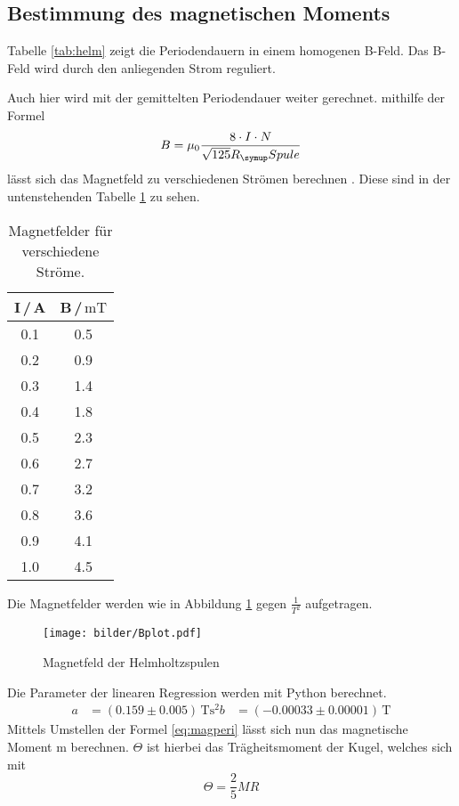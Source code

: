 \subsection{Bestimmung des magnetischen Moments}
Tabelle \ref{tab:helm} zeigt die Periodendauern in einem homogenen B-Feld. Das
B-Feld wird durch den anliegenden Strom reguliert.

Auch hier wird mit der gemittelten Periodendauer weiter gerechnet.
mithilfe der Formel
\begin{equation*}
  B=\mu_0\frac{8\cdot I\cdot N}{\sqrt{125}R_\su{Spule}}
\end{equation*}
lässt sich das Magnetfeld zu verschiedenen Strömen berechnen \cite{bfeld}.
Diese sind in der untenstehenden Tabelle \ref{tab:bfeld} zu sehen.
\begin{table}
  \centering
  \begin{tabular}{c c}
    \toprule
    I\,/\,A & B\,/\,$\si{\milli\tesla}$\\
    \midrule
    0.1 &  0.5 \\
    0.2 &  0.9 \\
    0.3 &  1.4 \\
    0.4 &  1.8 \\
    0.5 &  2.3 \\
    0.6 &  2.7 \\
    0.7 &  3.2 \\
    0.8 &  3.6 \\
    0.9 &  4.1 \\
    1.0 &  4.5 \\
    \bottomrule
  \end{tabular}
  \caption{Magnetfelder für verschiedene Ströme.}
  \label{tab:bfeld}
\end{table}
Die Magnetfelder werden wie in Abbildung \ref{fig:Bplot} gegen $\frac{1}{T^2}$
aufgetragen.
\begin{figure}
  \centering
  \texttt{[image: bilder/Bplot.pdf]}
  \caption{Magnetfeld der Helmholtzspulen}
  \label{fig:Bplot}
\end{figure}
Die Parameter der linearen Regression werden mit Python berechnet.
\begin{align*}
  a &= (0.159   \pm 0.005 )\,\si{\tesla\square\second}
  b &= (-0.00033 \pm 0.00001)\,\si{\tesla}
\end{align*}
Mittels Umstellen der Formel \eqref{eq:magperi} lässt sich nun das magnetische
Moment m berechnen. $\Theta$ ist hierbei das Trägheitsmoment der Kugel, welches
sich mit
\begin{equation*}
  \Theta = \frac{2}{5}MR
\end{equation*}

